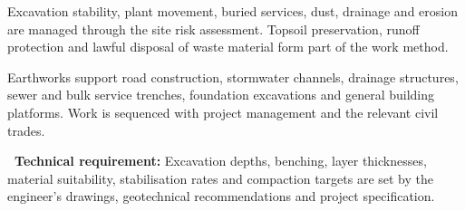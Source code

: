 \noindent
\begin{minipage}[t]{0.485\textwidth}
    \begin{tcolorbox}[enhanced, colback=white, colframe=mhlightgray, boxrule=0.8pt, arc=4pt, title={\bfseries\color{white}\faShieldAlt\ Safety \& Environmental Controls}, colbacktitle=mhnavy, left=8pt, right=8pt, top=7pt, bottom=7pt, drop shadow=black!4]
        {\fontsize{8.1pt}{11.3pt}\selectfont\color{mhtext}
        Excavation stability, plant movement, buried services, dust, drainage and erosion are managed through the site risk assessment. Topsoil preservation, runoff protection and lawful disposal of waste material form part of the work method.
        }
    \end{tcolorbox}
\end{minipage}
\hfill
\begin{minipage}[t]{0.485\textwidth}
    \begin{tcolorbox}[enhanced, colback=white, colframe=mhlightgray, boxrule=0.8pt, arc=4pt, title={\bfseries\color{white}\faRoad\ Related Civil Engineering Works}, colbacktitle=mhblue, left=8pt, right=8pt, top=7pt, bottom=7pt, drop shadow=black!4]
        {\fontsize{8.1pt}{11.3pt}\selectfont\color{mhtext}
        Earthworks support road construction, stormwater channels, drainage structures, sewer and bulk service trenches, foundation excavations and general building platforms. Work is sequenced with project management and the relevant civil trades.
        }
    \end{tcolorbox}
\end{minipage}

\vfill

\noindent
\begin{tcolorbox}[enhanced, colback=white, colframe=mhnavy, boxrule=0.8pt, arc=3pt, left=8pt, right=8pt, top=6pt, bottom=6pt, drop shadow=black!3]
    {\fontsize{8pt}{10.6pt}\selectfont\color{mhnavy}\bfseries\faCheckCircle\ Technical requirement:}\quad
    {\fontsize{8pt}{10.6pt}\selectfont\color{mhtext}
    Excavation depths, benching, layer thicknesses, material suitability, stabilisation rates and compaction targets are set by the engineer's drawings, geotechnical recommendations and project specification.
    }
\end{tcolorbox}

\clearpage
